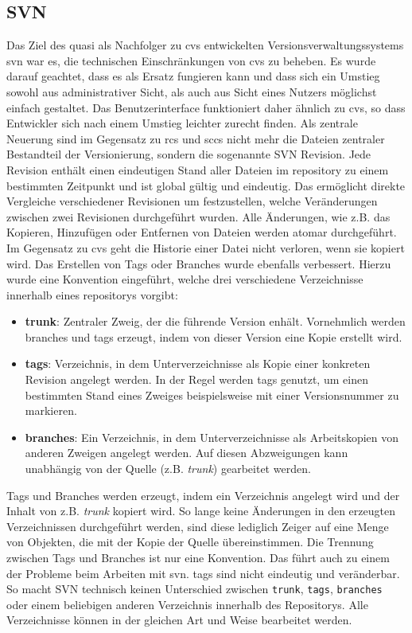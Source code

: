 \subsection{SVN}\label{sec:svn}
Das Ziel des quasi als Nachfolger zu \acrshort{cvs} entwickelten
Versionsverwaltungssystems \acrfull{svn} war es, die technischen
Einschränkungen von \acrshort{cvs} zu beheben. Es wurde darauf geachtet, dass
es als Ersatz fungieren kann und dass sich ein Umstieg sowohl aus
administrativer Sicht, als auch aus Sicht eines Nutzers möglichst einfach gestaltet.
Das Benutzerinterface funktioniert daher ähnlich zu \acrshort{cvs}, so dass
Entwickler sich nach einem Umstieg leichter zurecht finden. Als zentrale
Neuerung sind im Gegensatz zu \acrshort{rcs} und \mbox{\acrshort{sccs}} nicht mehr
die Dateien zentraler Bestandteil der Versionierung, sondern die sogenannte SVN
Revision. Jede Revision enthält einen eindeutigen Stand aller Dateien im
\gls{repository} zu einem bestimmten Zeitpunkt und ist global gültig und
eindeutig. Das ermöglicht direkte Vergleiche verschiedener Revisionen um
festzustellen, welche Veränderungen zwischen zwei Revisionen durchgeführt
wurden. Alle Änderungen, wie z.B. das Kopieren, Hinzufügen oder Entfernen von
Dateien werden atomar durchgeführt. Im Gegensatz zu \acrshort{cvs} geht die
Historie einer Datei nicht verloren, wenn sie kopiert wird. Das Erstellen von
Tags oder Branches wurde ebenfalls verbessert. Hierzu wurde eine Konvention
eingeführt, welche drei verschiedene Verzeichnisse innerhalb eines
\glspl{repository} vorgibt:

\begin{itemize}
\item \textbf{trunk}: Zentraler Zweig, der die führende Version enhält.
      Vornehmlich werden \gls{branch}es und \glspl{tag} erzeugt, indem von
      dieser Version eine Kopie erstellt wird.
\item \textbf{tags}: Verzeichnis, in dem Unterverzeichnisse als
      Kopie einer konkreten Revision angelegt werden. In der Regel werden
      \glspl{tag} genutzt, um einen bestimmten Stand eines Zweiges
      beispielsweise mit einer Versionsnummer zu markieren.
\item \textbf{branches}: Ein Verzeichnis, in dem Unterverzeichnisse als
      Arbeitskopien von anderen Zweigen angelegt werden. Auf diesen
      Abzweigungen kann unabhängig von der Quelle (z.B. \textit{trunk})
      gearbeitet werden.
\end{itemize}

Tags und Branches werden erzeugt, indem ein Verzeichnis angelegt wird und der
Inhalt von z.B. \textit{trunk} kopiert wird. So lange keine Änderungen in den
erzeugten Verzeichnissen durchgeführt werden, sind diese lediglich Zeiger auf
eine Menge von Objekten, die mit der Kopie der Quelle übereinstimmen. Die
Trennung zwischen Tags und Branches ist nur eine Konvention. Das führt auch zu
einem der Probleme beim Arbeiten mit \acrlong{svn}. \glspl{tag} sind nicht
eindeutig und veränderbar. So macht SVN technisch keinen Unterschied zwischen
\texttt{trunk}, \texttt{tags}, \texttt{branches} oder einem beliebigen anderen
Verzeichnis innerhalb des Repositorys. Alle Verzeichnisse können in der
gleichen Art und Weise bearbeitet werden. \cite[S.~383-385]{cd}

